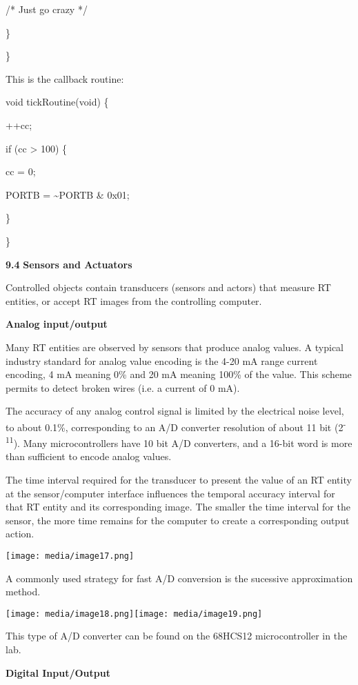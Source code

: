 /* Just go crazy */

\}

\}

This is the callback routine:

void tickRoutine(void) \{

++cc;

if (cc \textgreater{} 100) \{

cc = 0;

PORTB = \textasciitilde{}PORTB \& 0x01;

\}

\}

\textbf{9.4} \protect\hypertarget{teil5}{}{}\textbf{Sensors and
Actuators}

Controlled objects contain transducers (sensors and actors) that measure
RT entities, or accept RT images from the controlling computer.

\textbf{Analog input/output}

Many RT entities are observed by sensors that produce analog values. A
typical industry standard for analog value encoding is the 4-20 mA range
current encoding, 4 mA meaning 0\% and 20 mA meaning 100\% of the value.
This scheme permits to detect broken wires (i.e. a current of 0 mA).

The accuracy of any analog control signal is limited by the electrical
noise level, to about 0.1\%, corresponding to an A/D converter
resolution of about 11 bit (2\textsuperscript{-11}). Many
microcontrollers have 10 bit A/D converters, and a 16-bit word is more
than sufficient to encode analog values.

The time interval required for the transducer to present the value of an
RT entity at the sensor/computer interface influences the temporal
accuracy interval for that RT entity and its corresponding image. The
smaller the time interval for the sensor, the more time remains for the
computer to create a corresponding output action.

\texttt{[image: media/image17.png]}

A commonly used strategy for fast A/D conversion is the sucessive
approximation method.

\texttt{[image: media/image18.png]}\texttt{[image: media/image19.png]}

This type of A/D converter can be found on the 68HCS12 microcontroller
in the lab.

\textbf{Digital Input/Output}

